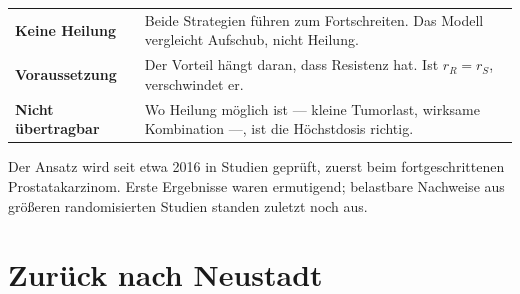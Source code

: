 \begin{warnung}
\begin{center}
{\small
\renewcommand{\arraystretch}{1.5}
\begin{tabular}{@{}P{2.4cm}P{6.2cm}@{}}
\toprule
\textbf{Keine Heilung} & Beide Strategien führen zum Fortschreiten. Das Modell vergleicht Aufschub, nicht Heilung.\\
\textbf{Voraussetzung} & Der Vorteil hängt daran, dass Resistenz  hat. Ist $r_R = r_S$, verschwindet er.\\
\textbf{Nicht übertragbar} & Wo Heilung möglich ist --- kleine Tumorlast, wirksame Kombination ---, ist die Höchstdosis richtig.\\
\bottomrule
\end{tabular}}
\end{center}

\begin{center}
\begin{minipage}{0.88\textwidth}
\end{minipage}
\end{center}

Der Ansatz wird seit etwa 2016 in Studien geprüft, zuerst beim fortgeschrittenen Prostatakarzinom. Erste Ergebnisse waren ermutigend; belastbare Nachweise aus größeren randomisierten Studien standen zuletzt noch aus.

\begin{center}
\begin{minipage}{0.88\textwidth}
\end{minipage}
\end{center}
\end{warnung}

\section{Zurück nach Neustadt}

